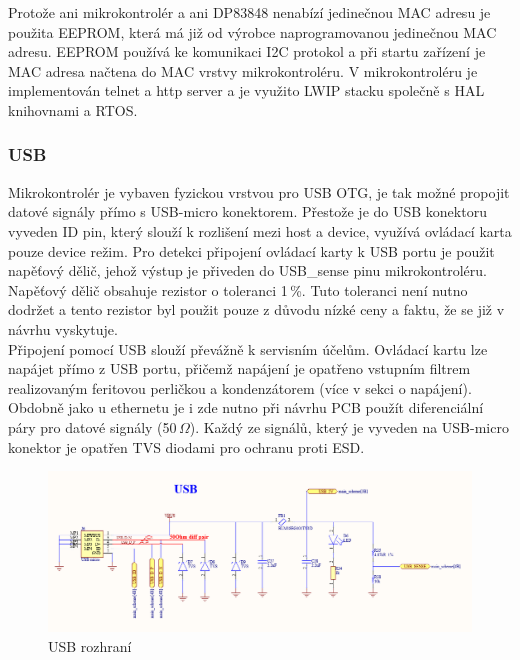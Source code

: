     Protože ani mikrokontrolér a ani DP83848 nenabízí jedinečnou MAC adresu je použita EEPROM,
    která má již od výrobce naprogramovanou jedinečnou MAC adresu.
    EEPROM používá ke komunikaci I2C protokol a při startu zařízení je MAC adresa
    načtena do MAC vrstvy mikrokontroléru. V mikrokontroléru je implementován telnet
    a http server a je využito LWIP stacku společně s HAL knihovnami a RTOS.\\

    \subsubsection{USB}
    Mikrokontrolér je vybaven fyzickou vrstvou pro USB OTG,
    je tak možné propojit datové signály přímo s USB-micro konektorem.
    Přestože je do USB konektoru vyveden ID pin, který slouží
    k rozlišení mezi host a device, využívá ovládací karta pouze device režim.
    Pro detekci připojení ovládací karty k USB portu je použit napěťový dělič, jehož výstup
    je přiveden do USB\_sense pinu mikrokontroléru. Napěťový dělič obsahuje rezistor o toleranci
    1\,\%. Tuto toleranci není nutno dodržet a tento rezistor byl použit pouze z důvodu nízké ceny
    a faktu, že se již v návrhu vyskytuje.\\

    Připojení pomocí USB slouží převážně k servisním účelům.
    Ovládací kartu lze napájet přímo z USB portu, přičemž napájení je opatřeno
    vstupním filtrem realizovaným feritovou perličkou a kondenzátorem (více v sekci o napájení).
    Obdobně jako u ethernetu je i zde nutno při návrhu PCB použít diferenciální páry
    pro datové signály (50\,$\Omega$). Každý ze signálů,
    který je vyveden na USB-micro konektor je opatřen TVS diodami pro ochranu
    proti ESD. \\

    \begin{figure}[ht!]
        \centering
        \includegraphics[width = 1\textwidth]{obrazky/USB.png}
        \caption{USB rozhraní}
        \label{fig: USB rozhraní}
    \end{figure}

